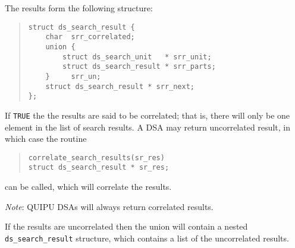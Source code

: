 The results form the following structure:

\begin{quote}\small\begin{verbatim}
struct ds_search_result {
    char  srr_correlated;
    union {
        struct ds_search_unit   * srr_unit;
        struct ds_search_result * srr_parts;
    }     srr_un;
    struct ds_search_result * srr_next;
};
\end{verbatim}\end{quote}

\begin{describe}
\item [\verb"srr\_correlated":] If \verb"TRUE" the the results are 
said to be correlated; that is, there will only be one element
in the list of search results.
A DSA may return uncorrelated result, in which case the routine
\begin{quote}\small\begin{verbatim}
correlate_search_results(sr_res)
struct ds_search_result * sr_res;
\end{verbatim}\end{quote}
can be called, which will correlate the results.

{\em Note}: QUIPU DSAs will always return correlated results.

\item [\verb"srr\_un":] If the results are uncorrelated then the 
union will contain a nested 
\verb"ds_search_result" structure, which 
contains a list of the uncorrelated results.


\end{describe}
